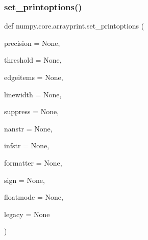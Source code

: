 \subsubsection{\texorpdfstring{set\+\_\+printoptions()}{set\_printoptions()}}
{\footnotesize\ttfamily def numpy.\+core.\+arrayprint.\+set\+\_\+printoptions (\begin{DoxyParamCaption}\item[{}]{precision = {\ttfamily None},  }\item[{}]{threshold = {\ttfamily None},  }\item[{}]{edgeitems = {\ttfamily None},  }\item[{}]{linewidth = {\ttfamily None},  }\item[{}]{suppress = {\ttfamily None},  }\item[{}]{nanstr = {\ttfamily None},  }\item[{}]{infstr = {\ttfamily None},  }\item[{}]{formatter = {\ttfamily None},  }\item[{}]{sign = {\ttfamily None},  }\item[{}]{floatmode = {\ttfamily None},  }\item[{}]{legacy = {\ttfamily None} }\end{DoxyParamCaption})}

